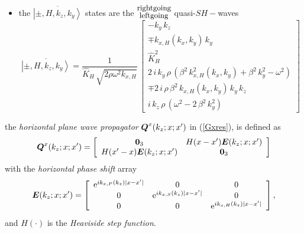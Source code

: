 \begin{itemize}
\item the $\overline{\left|\pm,H, k_{z},k_{y}  \right\rangle}$ states 
are the   ${\stackrel{\mbox{\small rightgoing}}{{}_{\mbox{\small 
leftgoing}}}}$  quasi-$SH-$waves 
\begin{equation} \label{SHxeigen}
\overline{\left|\pm,H, k_{z},k_{y}  \right\rangle}=
\frac{1}{\hat{K}_{H }\, \sqrt{2 \rho {\omega }^{  2}  {  k}_{  
x, H }}} \,\left[\begin{array}{c} 
- k_{y}\,{k}_{z} \\\mp k_{x,H}(k_x,k_y)\,k_{y} \\
  \hat{K}_{H}^2\\
2\,i\,k_{y}\,\rho \,\left({\beta^2}\,{k_{x,H}^2(k_x,k_y)} + 
     {\beta^2}\,{k_{y}^2} - {\omega^2} \right) \\
  \mp  2\,i\,\rho\,{\beta^2}\,k_{x,H}(k_x,k_y)\,k_{y}\,{k}_{z}\\
   i\,{k}_{z}\,\rho \,\left(  {\omega^2} -2\,{\beta^2}\,{k_{y}^2} \right) \end{array}\right]
\end{equation}
\end{itemize}
the {\em horizontal plane wave propagator\/} ${\mbox{\boldmath$\mit Q$\unboldmath}}^{x}(k_z;x;x^{\prime})$ in (\ref{Gxres}),
is defined  as
\begin{equation} \label{Qxdef}
{\mbox{\boldmath$\mit Q$\unboldmath}}^{x}(k_z;x;x^{\prime})=
\left[{\begin{array}{cc}{\bf 0}_{3}&H(x-{x}^{\prime}){\mbox{\boldmath$\mit E$\unboldmath}}(k_z;x;{x}^{\prime})\\
H(x^{\prime}-{x}){\mbox{\boldmath$\mit E$\unboldmath}}(k_z;x;{x}^{\prime})&{\bf 0}_{3}\end{array}}\right]
\end{equation}
with the {\em horizontal phase shift\/} array
\[
{\mbox{\boldmath$\mit E$\unboldmath}}(k_z;x;{x}^{\prime})=\left[{\begin{array}{ccc}
{\rm e}^{i{ k}_{x,P}(k_{z})|x-{x}^{\prime}|}&{ 0}&{ 0}\\ 
{ 0}&{\rm e}^{ 
i{ k}_{x,S}(k_{z})|x-{x}^{\prime}|}&{ 0}\\ { 0}&{ 0}&{\rm e}^{ 
i{ k}_{x,H}(k_{z})|x-{x}^{\prime}|}\end{array}}\right] ,
\]
and $H(\cdot)$ is the {\em Heaviside step function\/}.


